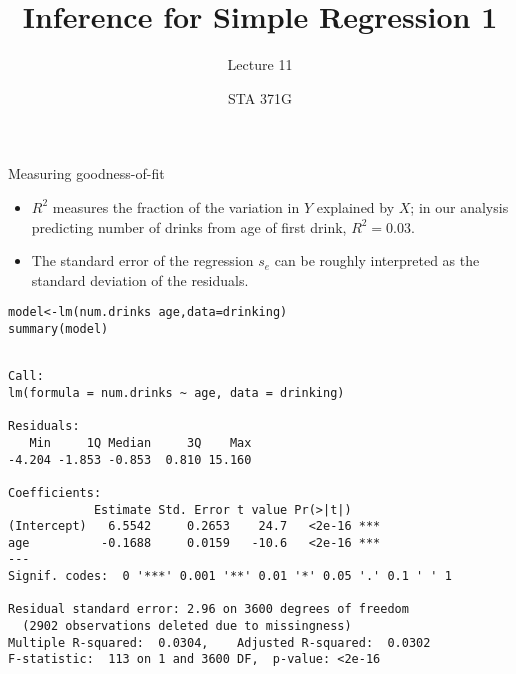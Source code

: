 \documentclass{beamer}\usepackage[]{graphicx}\usepackage[]{color}
\title{Inference for Simple Regression 1}
\subtitle{Lecture 11}
\author{STA 371G}
\makeatletter
\newcommand{\hlopt}[1]{\textcolor[rgb]{1,0.894,0.769}{#1}}%
\newcommand{\hlstd}[1]{\textcolor[rgb]{1,0.894,0.769}{#1}}%
\newcommand{\hlkwb}[1]{\textcolor[rgb]{0.804,0.776,0.451}{#1}}%
\newcommand{\hlkwc}[1]{\textcolor[rgb]{0.78,0.941,0.545}{#1}}%
\newcommand{\hlkwd}[1]{\textcolor[rgb]{1,0.78,0.769}{#1}}%
\newenvironment{kframe}{%
 \def\at@end@of@kframe{}%
 \ifinner\ifhmode%
  \def\at@end@of@kframe{\end{minipage}}%
  \begin{minipage}{\columnwidth}%
 \fi\fi%
 \def\FrameCommand##1{\hskip\@totalleftmargin \hskip-\fboxsep
 \colorbox{shadecolor}{##1}\hskip-\fboxsep
     \hskip-\linewidth \hskip-\@totalleftmargin \hskip\columnwidth}%
 \MakeFramed {\advance\hsize-\width
   \@totalleftmargin\z@ \linewidth\hsize
   \@setminipage}}%
 {\par\unskip\endMakeFramed%
 \at@end@of@kframe}
\newenvironment{knitrout}{}{} %
\makeatother
\begin{document}
  
  
  

  \frame{\maketitle}



  \begin{darkframes}
    \begin{frame}{Measuring goodness-of-fit}
      \begin{itemize}[<+->]
        \item $R^2$ measures the fraction of the variation in $Y$ explained by $X$;
        in our analysis predicting number of drinks from age of first drink, $R^2=0.03$.
        \item The \alert{standard error of the regression} $s_e$ can be roughly interpreted as
        the standard deviation of the residuals.
      \end{itemize}
    \end{frame}

    \begin{frame}[fragile]

      \fontsize{9}{9}\selectfont
\begin{knitrout}
\color{fgcolor}\begin{kframe}
\begin{alltt}
\hlstd{model} \hlkwb{<-} \hlkwd{lm}\hlstd{(num.drinks} \hlopt{~} \hlstd{age,} \hlkwc{data}\hlstd{=drinking)}
\hlkwd{summary}\hlstd{(model)}
\end{alltt}
\begin{verbatim}

Call:
lm(formula = num.drinks ~ age, data = drinking)

Residuals:
   Min     1Q Median     3Q    Max 
-4.204 -1.853 -0.853  0.810 15.160 

Coefficients:
            Estimate Std. Error t value Pr(>|t|)    
(Intercept)   6.5542     0.2653    24.7   <2e-16 ***
age          -0.1688     0.0159   -10.6   <2e-16 ***
---
Signif. codes:  0 '***' 0.001 '**' 0.01 '*' 0.05 '.' 0.1 ' ' 1

Residual standard error: 2.96 on 3600 degrees of freedom
  (2902 observations deleted due to missingness)
Multiple R-squared:  0.0304,	Adjusted R-squared:  0.0302 
F-statistic:  113 on 1 and 3600 DF,  p-value: <2e-16
\end{verbatim}
\end{kframe}
\end{knitrout}


\end{frame}
\end{darkframes}
\end{document}
